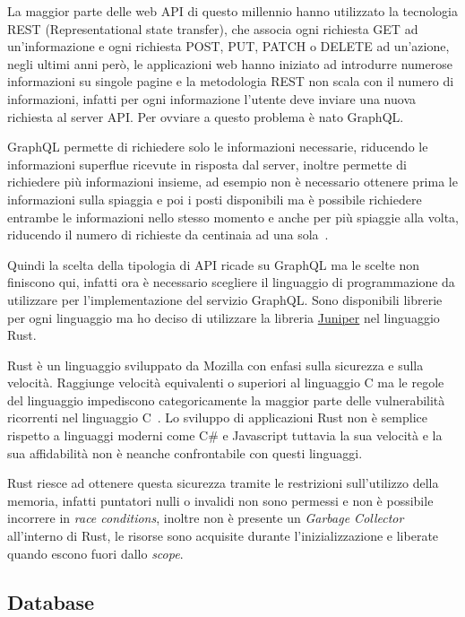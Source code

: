 La maggior parte delle web API di questo millennio hanno utilizzato la tecnologia REST (Representational state transfer), che associa ogni richiesta GET ad un'informazione e ogni richiesta POST, PUT, PATCH o DELETE ad un'azione, negli ultimi anni per\`o, le applicazioni web hanno iniziato ad introdurre numerose informazioni su singole pagine e la metodologia REST non scala con il numero di informazioni, infatti per ogni informazione l'utente deve inviare una nuova richiesta al server API\@. Per ovviare a questo problema \`e nato GraphQL\@.

GraphQL permette di richiedere solo le informazioni necessarie, riducendo le informazioni superflue ricevute in risposta dal server, inoltre permette di richiedere pi\`u informazioni insieme, ad esempio non \`e necessario ottenere prima le informazioni sulla spiaggia e poi i posti disponibili ma \`e possibile richiedere entrambe le informazioni nello stesso momento e anche per pi\`u spiaggie alla volta, riducendo il numero di richieste da centinaia ad una sola~\cite{graphql-website}.

Quindi la scelta della tipologia di API ricade su GraphQL ma le scelte non finiscono qui, infatti ora \`e necessario scegliere il linguaggio di programmazione da utilizzare per l'implementazione del servizio GraphQL\@. Sono disponibili librerie per ogni linguaggio ma ho deciso di utilizzare la libreria \href{https://github.com/graphql-rust/juniper}{Juniper} nel linguaggio Rust.

Rust \`e un linguaggio sviluppato da Mozilla con enfasi sulla sicurezza e sulla velocit\`a. Raggiunge velocit\`a equivalenti o superiori al linguaggio C ma le regole del linguaggio impediscono categoricamente la maggior parte delle vulnerabilit\`a ricorrenti nel linguaggio C~\cite{rust-website}. Lo sviluppo di applicazioni Rust non \`e semplice rispetto a linguaggi moderni come C\# e Javascript tuttavia la sua velocit\`a e la sua affidabilit\`a non \`e neanche confrontabile con questi linguaggi.

Rust riesce ad ottenere questa sicurezza tramite le restrizioni sull'utilizzo della memoria, infatti puntatori nulli o invalidi non sono permessi e non \`e possibile incorrere in \emph{race conditions}, inoltre non \`e presente un \emph{Garbage Collector} all'interno di Rust, le risorse sono acquisite durante l'inizializzazione e liberate quando escono fuori dallo \emph{scope}.

\subsection{Database}%
\label{sub:database}

